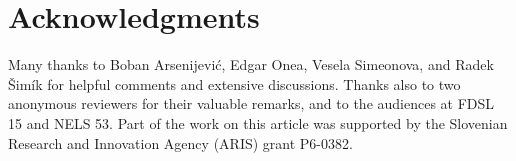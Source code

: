 \documentclass[output=paper,colorlinks,citecolor=brown]{langscibook}
\begin{document}
\section*{Acknowledgments}
Many thanks to Boban Arsenijevi\'{c}, Edgar Onea, Vesela Simeonova, and Radek \v{S}imík for helpful comments and extensive discussions. Thanks also to two anonymous reviewers for their valuable remarks, and to the audiences at FDSL 15 and NELS 53. Part of the work on this article was supported by the Slovenian Research and Innovation Agency (ARIS) grant P6-0382.



\printbibliography[heading=subbibliography,notkeyword=this]
\end{document}
